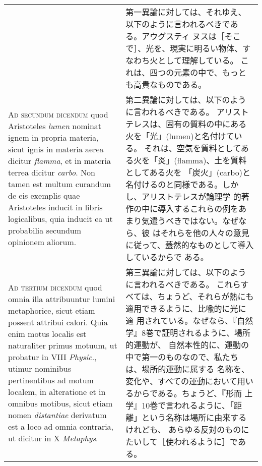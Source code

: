 \documentclass[10pt]{jsarticle} %
\begin{document}
\begin{longtable}{p{21em}p{21em}}
&

第一異論に対しては、それゆえ、以下のように言われるべきである。アウグスティ
ヌスは［そこで］、光を、現実に明るい物体、すなわち火として理解している。
これは、四つの元素の中で、もっとも高貴なものである。

\\


{\scshape Ad secundum dicendum} quod Aristoteles {\itshape lumen}
nominat ignem in propria materia, sicut ignis in materia aerea dicitur
{\itshape flamma}, et in materia terrea dicitur {\itshape carbo}. Non
tamen est multum curandum de eis exemplis quae Aristoteles inducit in
libris logicalibus, quia inducit ea ut probabilia secundum opinionem
aliorum.

&

第二異論に対しては、以下のように言われるべきである。
アリストテレスは、固有の質料の中にある火を「光」(lumen)と名付けている。
 それは、空気を質料としてある火を「炎」(flamma)、土を質料としてある火を
 「炭火」(carbo)と名付けるのと同様である。しかし、アリストテレスが論理学
 的著作の中に導入するこれらの例をあまり気遣うべきではない。なぜなら、彼
 はそれらを他の人々の意見に従って、蓋然的なものとして導入しているからで
 ある。

\\


{\scshape Ad tertium dicendum} quod omnia illa
attribuuntur lumini metaphorice, sicut etiam possent attribui
calori. Quia enim motus localis est naturaliter primus motuum, ut
probatur in VIII {\itshape Physic}., utimur nominibus pertinentibus ad motum
localem, in alteratione et in omnibus motibus, sicut etiam nomen
{\itshape distantiae} derivatum est a loco ad omnia contraria, ut dicitur in X
{\itshape Metaphys}.

&

第三異論に対しては、以下のように言われるべきである。
これらすべては、ちょうど、それらが熱にも適用できるように、比喩的に光に適
 用されている。なぜなら、『自然学』8巻で証明されるように、場所的運動が、
 自然本性的に、運動の中で第一のものなので、私たちは、場所的運動に属する
 名称を、変化や、すべての運動において用いるからである。ちょうど、『形而
 上学』10巻で言われるように、「距離」という名称は場所に由来するけれども、
 あらゆる反対のものにたいして［使われるように］である。



\end{longtable}
\newpage
\end{document}
